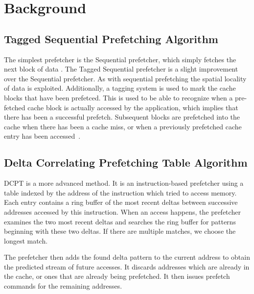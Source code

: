 \section{Background}


\subsection{Tagged Sequential Prefetching Algorithm}

The simplest prefetcher is the Sequential prefetcher, which simply fetches the
next block of data \cite{seq}. The Tagged Sequential prefetcher is a slight
improvement over the Sequential prefetcher. As with sequential prefetching the
spatial locality of data is exploited. Additionally, a tagging system is used to
mark the cache blocks that have been prefetced. This is used to be able to
recognize when a pre-fetched cache block is actually accessed by the
application, which implies that there has been a successful prefetch. Subsequent
blocks are prefetched into the cache when there has been a cache miss, or when a
previously prefetched cache entry has been accessed~\cite{grannaes}.

\subsection{Delta Correlating Prefetching Table Algorithm}

DCPT is a more advanced method. It is an instruction-based prefetcher using a
table indexed by the address of the instruction which tried to access memory.
Each entry contains a ring buffer of the most recent deltas between successive
addresses accessed by this instruction. When an access happens, the prefetcher
examines the two most recent deltas and searches the ring buffer for patterns
beginning with these two deltas. If there are multiple matches, we choose the
longest match.

The prefetcher then adds the found delta pattern to the current address to
obtain the predicted stream of future accesses. It discards addresses which
are already in the cache, or ones that are already being prefetched. It then
issues prefetch commands for the remaining addresses.


